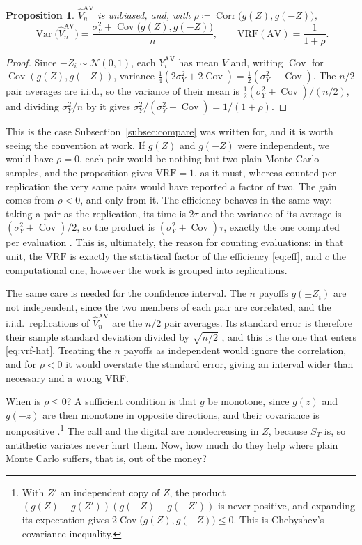 \documentclass[11pt,a4paper]{article}
\theoremstyle{plain}
\newtheorem{proposition}[theorem]{Proposition}
\theoremstyle{definition}
\theoremstyle{remark}
\newcommand{\1}{\mathbf{1}}
\newcommand{\eqdef}{\coloneqq}
\newcommand{\Var}{\operatorname{Var}}
\newcommand{\VRF}{\mathrm{VRF}}
\newcommand{\Cov}{\operatorname{Cov}}
\newcommand{\Corr}{\operatorname{Corr}}
\begin{document}
\begin{proposition}\label{prop:av}
$\hat V^{\mathrm{AV}}_n$ is unbiased, and, with $\rho \eqdef \Corr\bigl(g(Z), g(-Z)\bigr)$,
\[
  \Var\bigl(\hat V^{\mathrm{AV}}_n\bigr) = \frac{\sigma_Y^2 + \Cov\bigl(g(Z), g(-Z)\bigr)}{n},
  \qquad
  \VRF(\mathrm{AV}) = \frac{1}{1 + \rho} .
\]
\end{proposition}

\begin{proof}
Since $-Z_i \sim \mathcal N(0,1)$, each $Y_i^{\mathrm{AV}}$ has mean $V$ and, writing $\Cov$ for $\Cov(g(Z), g(-Z))$, variance $\frac14(2\sigma_Y^2 + 2\Cov) = \frac12(\sigma_Y^2 + \Cov)$. The $n/2$ pair averages are i.i.d., so the variance of their mean is $\frac12(\sigma_Y^2 + \Cov)/(n/2)$, and dividing $\sigma_Y^2/n$ by it gives $\sigma_Y^2/(\sigma_Y^2 + \Cov) = 1/(1 + \rho)$.
\end{proof}

This is the case Subsection~\ref{subsec:compare} was written for, and it is worth seeing the convention at work. If $g(Z)$ and $g(-Z)$ were independent, we would have $\rho = 0$, each pair would be nothing but two plain Monte Carlo samples, and the proposition gives $\VRF = 1$, as it must, whereas counted per replication the very same pairs would have reported a factor of two. The gain comes from $\rho < 0$, and only from it. The efficiency behaves in the same way: taking a pair as the replication, its time is $2\tau$ and the variance of its average is $(\sigma_Y^2 + \Cov)/2$, so the product is $(\sigma_Y^2 + \Cov)\tau$, exactly the one computed per evaluation \cite[\S 1.1.3]{glasserman}. This is, ultimately, the reason for counting evaluations: in that unit, the $\VRF$ is exactly the statistical factor of the efficiency \eqref{eq:eff}, and $c$ the computational one, however the work is grouped into replications.

The same care is needed for the confidence interval. The $n$ payoffs $g(\pm Z_i)$ are not independent, since the two members of each pair are correlated, and the i.i.d.\ replications of $\hat V^{\mathrm{AV}}_n$ are the $n/2$ pair averages. Its standard error is therefore their sample standard deviation divided by $\sqrt{n/2}$ \cite[(4.27)--(4.28)]{glasserman}, and this is the one that enters \eqref{eq:vrf-hat}. Treating the $n$ payoffs as independent would ignore the correlation, and for $\rho < 0$ it would overstate the standard error, giving an interval wider than necessary and a wrong VRF.

When is $\rho \le 0$? A sufficient condition is that $g$ be monotone, since $g(z)$ and $g(-z)$ are then monotone in opposite directions, and their covariance is nonpositive \cite[\S 4.2]{glasserman}.\footnote{With $Z'$ an independent copy of $Z$, the product $(g(Z) - g(Z'))(g(-Z) - g(-Z'))$ is never positive, and expanding its expectation gives $2\Cov\bigl(g(Z), g(-Z)\bigr) \le 0$. This is Chebyshev's covariance inequality.} The call and the digital are nondecreasing in $Z$, because $S_T$ is, so antithetic variates never hurt them. Now, how much do they help where plain Monte Carlo suffers, that is, out of the money?
\end{document}
